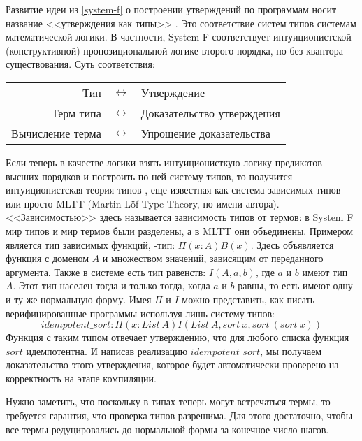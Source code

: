 Развитие идеи из \ref{system-f} о построении утверждений по программам носит
название <<утверждения как типы>> \cite{propositions-as-types}. Это соответствие
систем типов системам математической логики. В частности, System F
соответствует интуиционистской (конструктивной) пропозициональной логике второго
порядка, но без квантора существования. Суть соответствия:

\begin{tabular}{rcl}
  Тип & \(\leftrightarrow\) & Утверждение\\
  Терм типа & \(\leftrightarrow\) & Доказательство утверждения\\
  Вычисление терма & \(\leftrightarrow\) & Упрощение доказательства
\end{tabular}

Если теперь в качестве логики взять интуиционисткую логику предикатов высших
порядков и построить по ней систему типов, то получится интуиционистская
теория типов \cite{intuitionistic-theory-of-types}, еще известная как система
зависимых типов  или просто MLTT (Martin-L\"of Type Theory, по имени автора).
<<Зависимостью>> здесь называется зависимость типов от термов:
в System F мир типов и мир термов были разделены, а в MLTT они объединены.
Примером является тип зависимых функций, \textPi-тип: \(\Pi(x : A)B(x)\).
Здесь объявляется функция с доменом \(A\) и множеством значений, зависящим от
переданного аргумента. Также в системе есть тип равенств: \(I(A, a, b)\), где \(a\) и
\(b\) имеют тип \(A\). Этот тип населен тогда и только тогда, когда \(a\) и \(b\)
равны, то есть имеют одну и ту же нормальную форму. Имея \(\Pi\) и \(I\) можно
представить, как писать верифицированные программы используя лишь систему типов:
\[
  idempotent\_sort : \Pi(x : List\ A) I(List\ A, sort\ x, sort\ (sort\ x))
\]
Функция с таким типом отвечает утверждению, что для любого списка функция \(sort\)
идемпотентна. И написав реализацию \(idempotent\_sort\), мы получаем доказательство
этого утверждения, которое будет автоматически проверено на корректность на этапе
компиляции.

Нужно заметить, что поскольку в типах теперь могут встречаться термы, то требуется
гарантия, что проверка типов разрешима. Для этого достаточно, чтобы все термы
редуцировались до нормальной формы за конечное число шагов.
